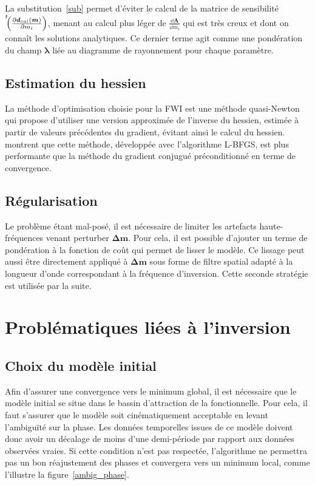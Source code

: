 La substitution~\ref{sub} permet d'éviter le calcul de la matrice de sensibilité $\tr{\left( \frac{\dd \bm{d}_{cal}(\bm{m}) }{\dd m_{i}} \right)}$, menant au calcul plus léger de $\frac{\dd \bm{A}}{\dd m_{i}}$ qui est très creux et dont on connaît les solutions analytiques. Ce dernier terme agit comme une pondération du champ $\bm{\lambda}$ liée au diagramme de rayonnement pour chaque paramètre.


\subsection{Estimation du hessien}

La méthode d'optimisation choisie pour la FWI est une méthode quasi-Newton qui propose d'utiliser une version approximée de l'inverse du hessien, estimée à partir de valeurs précédentes du gradient, évitant ainsi le calcul du hessien. \cite{brossier_2009} montrent que cette méthode, développée avec l'algorithme L-BFGS, est plus performante que la méthode du gradient conjugué préconditionné en terme de convergence. 


\subsection{Régularisation}

Le problème étant mal-posé, il est nécessaire de limiter les artefacts haute-fréquences venant perturber $\bm{\Delta m}$. Pour cela, il est possible d'ajouter un terme de pondération à la fonction de coût qui permet de lisser le modèle. Ce lissage peut aussi être directement appliqué à $\bm{\Delta m}$ sous forme de filtre spatial adapté à la longueur d'onde correspondant à la fréquence d'inversion. Cette seconde stratégie est utilisée par la suite.

\section{Problématiques liées à l'inversion}

\subsection{Choix du modèle initial \label{fwi:choix_modele}}
Afin d'assurer une convergence vers le minimum global, il est nécessaire que le modèle initial se situe dans le bassin d'attraction de la fonctionnelle. Pour cela, il faut s'assurer que le modèle soit cinématiquement acceptable en levant l’ambiguïté sur la phase. Les données temporelles issues de ce modèle doivent donc avoir un décalage de moins d'une demi-période par rapport aux données observées vraies. Si cette condition n'est pas respectée, l'algorithme ne permettra pas un bon réajustement des phases et convergera vers un minimum local, comme l'illustre la figure~\ref{ambig_phase}.%

